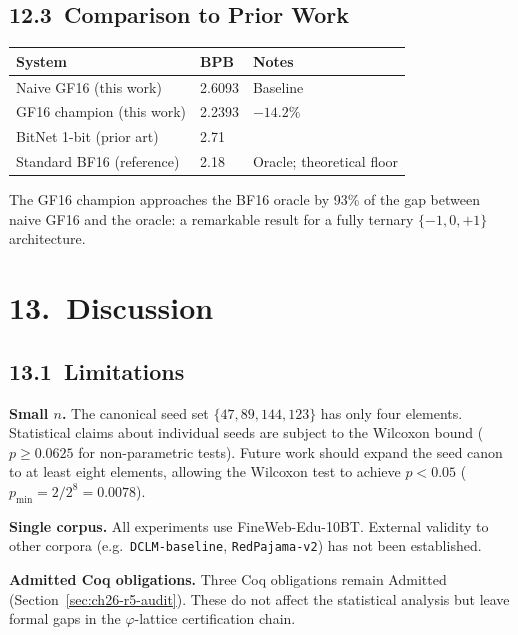 \subsection{12.3\ Comparison to Prior Work}

\begin{longtable}[]{@{}lll@{}}
\toprule\noalign{}
System & BPB & Notes \\
\midrule\noalign{}
\endhead
\bottomrule\noalign{}
\endlastfoot
Naive GF16 (this work) & 2.6093 & Baseline \\
GF16 champion (this work) & 2.2393 & \(-14.2\%\) \\
BitNet 1-bit (prior art) & 2.71 & \cite{ma2024era} \\
Standard BF16 (reference) & 2.18 & Oracle; theoretical floor \\
\end{longtable}

\noindent
The GF16 champion approaches the BF16 oracle by 93\% of the gap between
naive GF16 and the oracle: a remarkable result for a fully ternary
\(\{-1, 0, +1\}\) architecture.

\section{13.\ Discussion}\label{sec:ch26-discussion}

\subsection{13.1\ Limitations}

\textbf{Small \(n\).}
The canonical seed set \(\{47, 89, 144, 123\}\) has only four elements.
Statistical claims about individual seeds are subject to the
Wilcoxon bound (\(p \geq 0.0625\) for non-parametric tests).
Future work should expand the seed canon to at least eight elements,
allowing the Wilcoxon test to achieve \(p < 0.05\) (\(p_{\min} = 2/2^8 = 0.0078\)).

\textbf{Single corpus.}
All experiments use FineWeb-Edu-10BT.  External validity to other corpora
(e.g.\ \texttt{DCLM-baseline}, \texttt{RedPajama-v2}) has not been
established.

\textbf{Admitted Coq obligations.}
Three Coq obligations remain Admitted (Section~\ref{sec:ch26-r5-audit}).
These do not affect the statistical analysis but leave formal gaps in the
\(\varphi\)-lattice certification chain.

